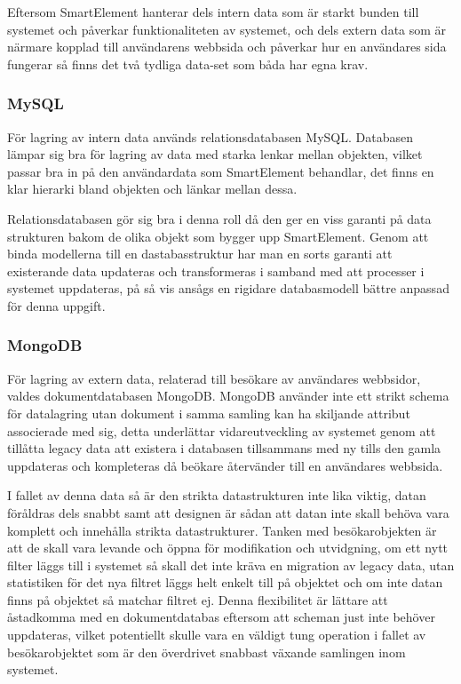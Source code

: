 Eftersom SmartElement hanterar dels intern data som är starkt bunden till systemet och påverkar funktionaliteten av systemet, och dels extern data som är närmare kopplad till användarens webbsida och påverkar hur en användares sida fungerar så finns det två tydliga data-set som båda har egna krav.

\subsubsection{MySQL}

För lagring av intern data används relationsdatabasen MySQL. Databasen lämpar sig bra för lagring av data med starka lenkar mellan objekten, vilket passar bra in på den användardata som SmartElement behandlar, det finns en klar hierarki bland objekten och länkar mellan dessa.

Relationsdatabasen gör sig bra i denna roll då den ger en viss garanti på data strukturen bakom de olika objekt som bygger upp SmartElement. Genom att binda modellerna till en dastabasstruktur har man en sorts garanti att existerande data updateras och transformeras i samband med att processer i systemet uppdateras, på så vis ansågs en rigidare databasmodell bättre anpassad för denna uppgift.

\subsubsection{MongoDB}

För lagring av extern data, relaterad till besökare av användares webbsidor, valdes dokumentdatabasen MongoDB. MongoDB använder inte ett strikt schema för datalagring utan dokument i samma samling kan ha skiljande attribut associerade med sig, detta underlättar vidareutveckling av systemet genom att tillåtta legacy data att existera i databasen tillsammans med ny tills den gamla uppdateras och kompleteras då beökare återvänder till en användares webbsida.

I fallet av denna data så är den strikta datastrukturen inte lika viktig, datan föråldras dels snabbt samt att designen är sådan att datan inte skall behöva vara komplett och innehålla strikta datastrukturer. Tanken med besökarobjekten är att de skall vara levande och öppna för modifikation och utvidgning, om ett nytt filter läggs till i systemet så skall det inte kräva en migration av legacy data, utan statistiken för det nya filtret läggs helt enkelt till på objektet och om inte datan finns på objektet så matchar filtret ej. Denna flexibilitet är lättare att åstadkomma med en dokumentdatabas eftersom att scheman just inte behöver uppdateras, vilket potentiellt skulle vara en väldigt tung operation i fallet av besökarobjektet som är den överdrivet snabbast växande samlingen inom systemet.

